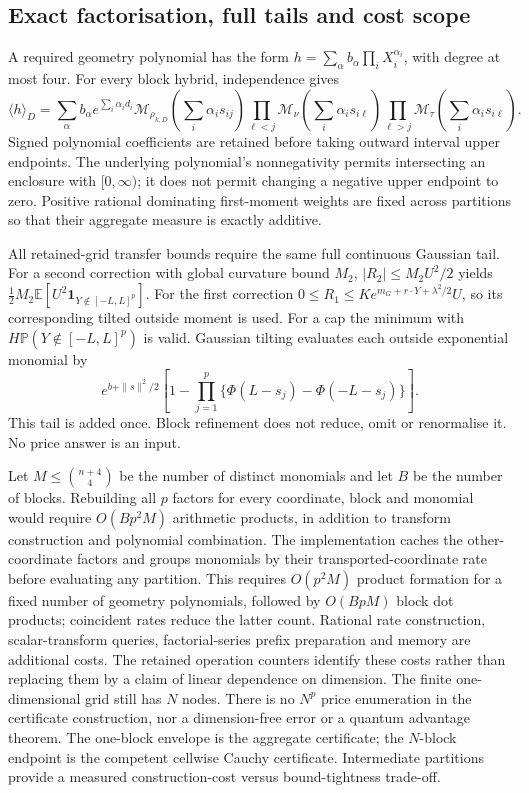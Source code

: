 \subsection{Exact factorisation, full tails and cost scope}

A required geometry polynomial has the form
$h=\sum_\alpha b_\alpha\prod_iX_i^{\alpha_i}$, with degree at
most four. For every block hybrid, independence gives
\[
 \langle h\rangle_D=\sum_\alpha b_\alpha
 e^{\sum_i\alpha_id_i}
 \mathcal M_{\rho_{k,D}}\!\left(\sum_i\alpha_is_{ij}\right)
 \prod_{\ell<j}\mathcal M_\nu\!\left(\sum_i\alpha_is_{i\ell}\right)
 \prod_{\ell>j}\mathcal M_\tau\!\left(\sum_i\alpha_is_{i\ell}\right).
\]
Signed polynomial coefficients are retained before taking outward
interval upper endpoints. The underlying polynomial's nonnegativity
permits intersecting an enclosure with $[0,\infty)$; it does not
permit changing a negative upper endpoint to zero. Positive rational
dominating first-moment weights are fixed across partitions so that
their aggregate measure is exactly additive.

All retained-grid transfer bounds require the same full continuous
Gaussian tail. For a second correction with global curvature bound
$M_2$, $|R_2|\leq M_2U^2/2$ yields
$\frac12M_2\mathbb E[U^2\mathbf1_{Y\notin[-L,L]^p}]$.
For the first correction $0\leq R_1\leq K e^{m_G+r\cdot Y+\lambda^2/2}U$,
so its corresponding tilted outside moment is used. For a cap the
minimum with $H\mathbb P(Y\notin[-L,L]^p)$ is valid. Gaussian
tilting evaluates each outside exponential monomial by
\[
 e^{b+\|s\|^2/2}
 \left[1-\prod_{j=1}^p\{\Phi(L-s_j)-\Phi(-L-s_j)\}\right].
\]
This tail is added once. Block refinement does not reduce, omit or
renormalise it. No price answer is an input.

Let $M\leq\binom{n+4}{4}$ be the number of distinct monomials and
let $B$ be the number of blocks. Rebuilding all $p$ factors for every
coordinate, block and monomial would require $O(Bp^2M)$ arithmetic
products, in addition to transform construction and polynomial
combination. The implementation caches the other-coordinate factors and
groups monomials by their transported-coordinate rate before evaluating
any partition. This requires $O(p^2M)$ product formation for a fixed
number of geometry polynomials, followed by $O(BpM)$ block dot products;
coincident rates reduce the latter count. Rational rate construction,
scalar-transform queries, factorial-series prefix preparation and
memory are additional costs. The retained operation counters identify
these costs rather than replacing them by a claim of linear dependence
on dimension. The finite one-
dimensional grid still has $N$ nodes. There is no $N^p$ price
enumeration in the certificate construction, nor a dimension-free
error or a quantum advantage theorem. The one-block envelope is the
aggregate certificate; the $N$-block endpoint is the competent
cellwise Cauchy certificate. Intermediate partitions provide a
measured construction-cost versus bound-tightness trade-off.

